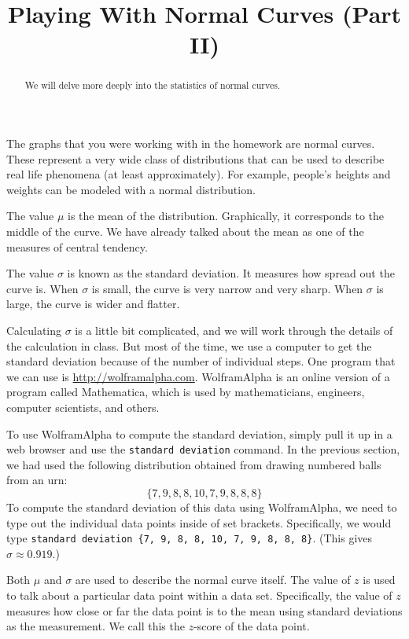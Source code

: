 \documentclass{ximera}
\title{Playing With Normal Curves (Part II)}
\begin{document}
\begin{abstract}
We will delve more deeply into the statistics of normal curves.
\end{abstract}
\maketitle

The graphs that you were working with in the homework are normal curves.  These represent a very wide class of distributions that can be used to describe real life phenomena (at least approximately). For example, people's heights and weights can be modeled with a normal distribution.

The value $\mu$ is the mean of the distribution. Graphically, it corresponds to the middle of the curve. We have already talked about the mean as one of the measures of central tendency.

The value $\sigma$ is known as the standard deviation. It measures how spread out the curve is. When $\sigma$ is small, the curve is very narrow and very sharp. When $\sigma$ is large, the curve is wider and flatter.

Calculating $\sigma$ is a little bit complicated, and we will work through the details of the calculation in class. But most of the time, we use a computer to get the standard deviation because of the number of individual steps. One program that we can use is \href{http://wolframalpha.com}{http://wolframalpha.com}. WolframAlpha is an online version of a program called Mathematica, which is used by mathematicians, engineers, computer scientists, and others.

To use WolframAlpha to compute the standard deviation, simply pull it up in a web browser and use the \verb|standard deviation| command. In the previous section, we had used the following distribution obtained from drawing numbered balls from an urn:
\[ \{ 7, 9, 8, 8, 10, 7, 9, 8, 8, 8 \} \]
To compute the standard deviation of this data using WolframAlpha, we need to type out the individual data points inside of set brackets. Specifically, we would type \verb|standard deviation {7, 9, 8, 8, 10, 7, 9, 8, 8, 8}|. (This gives $\sigma \approx 0.919$.)

Both $\mu$ and $\sigma$ are used to describe the normal curve itself. The value of $z$ is used to talk about a particular data point within a data set. Specifically, the value of $z$ measures how close or far the data point is to the mean using standard deviations as the measurement. We call this the $z$-score of the data point.
\end{document}
